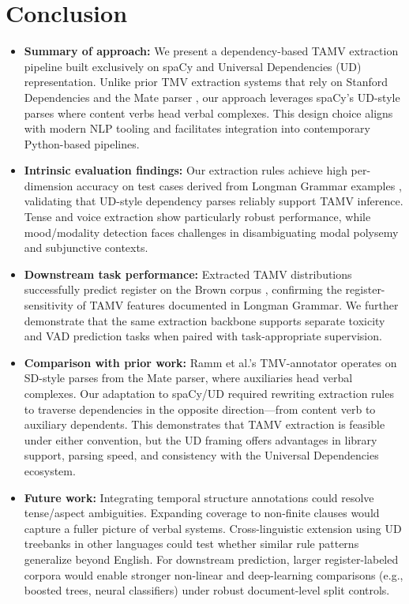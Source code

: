 \documentclass[11pt]{article}
\begin{document}
\section{Conclusion}
\begin{itemize}
  \item \textbf{Summary of approach:} We present a dependency-based TAMV extraction pipeline built exclusively on spaCy and Universal Dependencies (UD) representation. Unlike prior TMV extraction systems that rely on Stanford Dependencies and the Mate parser \citep{Ramm2017AnnotatingGerman}, our approach leverages spaCy's UD-style parses where content verbs head verbal complexes. This design choice aligns with modern NLP tooling and facilitates integration into contemporary Python-based pipelines. \citep{Nivre2020UniversalCollection,Okhapkin2021ConstructingLibraries}

  \item \textbf{Intrinsic evaluation findings:} Our extraction rules achieve high per-dimension accuracy on test cases derived from Longman Grammar examples \citep{Biber20101999LongmanEnglish}, validating that UD-style dependency parses reliably support TAMV inference. Tense and voice extraction show particularly robust performance, while mood/modality detection faces challenges in disambiguating modal polysemy and subjunctive contexts.

  \item \textbf{Downstream task performance:} Extracted TAMV distributions successfully predict register on the Brown corpus \citep{19684/682R15.00.}, confirming the register-sensitivity of TAMV features documented in Longman Grammar. We further demonstrate that the same extraction backbone supports separate toxicity and VAD prediction tasks when paired with task-appropriate supervision.

  \item \textbf{Comparison with prior work:} Ramm et al.'s TMV-annotator \citep{Ramm2017AnnotatingGerman} operates on SD-style parses from the Mate parser, where auxiliaries head verbal complexes. Our adaptation to spaCy/UD required rewriting extraction rules to traverse dependencies in the opposite direction---from content verb to auxiliary dependents. This demonstrates that TAMV extraction is feasible under either convention, but the UD framing offers advantages in library support, parsing speed, and consistency with the Universal Dependencies ecosystem. \citep{Nivre2020UniversalCollection}

  \item \textbf{Future work:} Integrating temporal structure annotations \citep{Derczynski2012AnStructure} could resolve tense/aspect ambiguities. Expanding coverage to non-finite clauses would capture a fuller picture of verbal systems. Cross-linguistic extension using UD treebanks in other languages could test whether similar rule patterns generalize beyond English. For downstream prediction, larger register-labeled corpora would enable stronger non-linear and deep-learning comparisons (e.g., boosted trees, neural classifiers) under robust document-level split controls.
\end{itemize}
\end{document}
